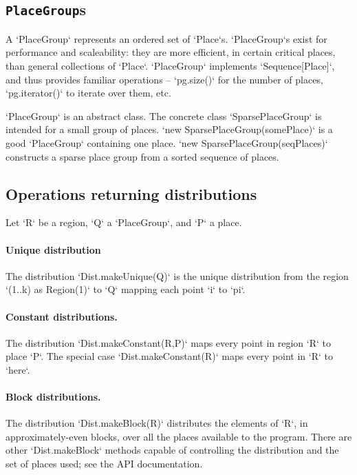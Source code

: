 \subsection{{\tt PlaceGroup}s}

A \xcd`PlaceGroup` represents an ordered set of \xcd`Place`s.
\xcd`PlaceGroup`s exist for performance and scaleability: they are more
efficient, in certain critical places, than general collections of
\xcd`Place`. \xcd`PlaceGroup` implements \xcd`Sequence[Place]`, and thus
provides familiar operations -- \xcd`pg.size()` for the number of places,
\xcd`pg.iterator()` to iterate over them, etc.  

\xcd`PlaceGroup` is an abstract class.  The concrete class
\xcd`SparsePlaceGroup` is intended for a small group of places. 
\xcd`new SparsePlaceGroup(somePlace)` is a good \xcd`PlaceGroup` containing
one place.  
\xcd`new SparsePlaceGroup(seqPlaces)`
constructs a sparse place group from a sorted sequence of places.

\subsection{Operations returning distributions}



Let \xcd`R` be a region, \xcd`Q` 
a \xcd`PlaceGroup`, and \xcd`P` a place.

\paragraph{Unique distribution} 
The distribution \xcd`Dist.makeUnique(Q)` is the unique distribution from the
region \xcd`(1..k) as Region(1)` to \xcd`Q` mapping each point \xcd`i` to
\xcd`pi`.


\paragraph{Constant distributions.} 
The distribution \xcd`Dist.makeConstant(R,P)` maps every point in region
\xcd`R` to place \xcd`P`.  
The special case \xcd`Dist.makeConstant(R)` maps every point in \xcd`R` to
\xcd`here`. 

\paragraph{Block distributions.}
The distribution \xcd`Dist.makeBlock(R)` distributes the elements of \xcd`R`,
in approximately-even blocks, over all the places available to the program. 
There are other \xcd`Dist.makeBlock` methods capable of controlling the
distribution and the set of places used; see the API documentation.


